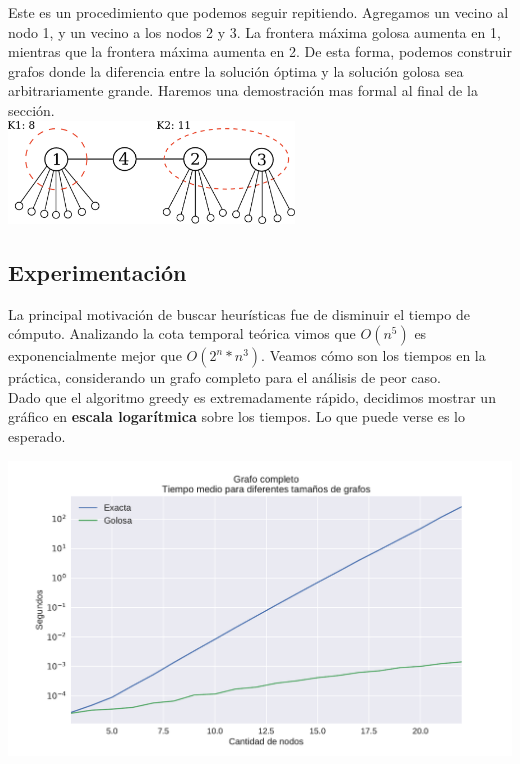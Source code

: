 Este es un procedimiento que podemos seguir repitiendo. Agregamos un vecino al nodo 1, y un vecino a los nodos 2 y 3. La frontera máxima golosa aumenta en 1, mientras que la frontera máxima aumenta en 2. De esta forma, podemos construir grafos donde la diferencia entre la solución óptima y la solución golosa sea arbitrariamente grande. Haremos una demostración mas formal al final de la sección.\\

{\centering
    \includegraphics[width=0.57\textwidth]{informe/imgs/greedy_base_nodes_v2.png} \\
}

\subsection{Experimentación}


La principal motivación de buscar heurísticas fue de disminuir el tiempo de cómputo. Analizando la cota temporal teórica vimos que $O(n^5)$ es exponencialmente mejor que $O(2^{n} * n^{3})$. Veamos cómo son los tiempos en la práctica, considerando un grafo completo para el análisis de peor caso. \\

Dado que el algoritmo greedy es extremadamente rápido, decidimos mostrar un gráfico en \textbf{escala logarítmica} sobre los tiempos. Lo que puede verse es lo esperado.

{\centering
    \includegraphics[width=1\textwidth]{informe/imgs/exp_completo_tiempo_greedy_exacta_logy.pdf} \\
}

